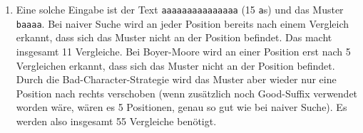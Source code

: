 \documentclass[11pt,a4paper]{article}
\begin{document}
\begin{loesung}
\begin{enumerate}
        \textbf{Horspool\textnormal{ (12 Vergleiche)}:}\\
        \begin{minipage}[t]{0.95\textwidth}
        \begin{Verbatim}[commandchars=\\\{\}]
DAS ENDE EINES LEBENS
LEBE\underline{N}
 LE\underline{B}\textbf{EN}
      LEBE\underline{N}
           LEBE\underline{N}
               \textbf{LEBEN}
                LEBE\underline{N}
        \end{Verbatim}
        \end{minipage} \\

        \textbf{Sunday\textnormal{ (13 Vergleiche)}:}\\
        \begin{minipage}[t]{0.95\textwidth}
        \begin{Verbatim}[commandchars=\\\{\}]
DAS ENDE EINES LEBENS
LEBE\underline{N}
 LE\underline{B}\textbf{EN}
       LEB\underline{E}\textbf{N}
         LEBE\underline{N}
               \textbf{LEBEN}
                LEBE\underline{N}
        \end{Verbatim}
        \end{minipage} \\

        \textbf{kombiniert\textnormal{ (13 Vergleiche)}:}\\
        \begin{minipage}[t]{0.95\textwidth}
        \begin{Verbatim}[commandchars=\\\{\}]
DAS ENDE EINES LEBENS
LEBE\underline{N}
 LE\underline{B}\textbf{EN}
       LEB\underline{E}\textbf{N}
            LEBE\underline{N}
               \textbf{LEBEN}
                LEBE\underline{N}
        \end{Verbatim}
        \end{minipage}

        \item
        Eine solche Eingabe ist der Text \texttt{aaaaaaaaaaaaaaa} (15 \texttt{a}s) und das Muster \texttt{baaaa}.
        Bei naiver Suche wird an jeder Position bereits nach einem Vergleich erkannt, dass sich das Muster nicht an der Position befindet.
        Das macht insgesamt 11 Vergleiche.
        Bei Boyer-Moore wird an einer Position erst nach 5 Vergleichen erkannt, dass sich das Muster nicht an der Position befindet.
        Durch die Bad-Character-Strategie wird das Muster aber wieder nur eine Position nach rechts verschoben (wenn zusätzlich noch Good-Suffix verwendet worden wäre, wären es 5 Positionen, genau so gut wie bei naiver Suche).
        Es werden also insgesamt 55 Vergleiche benötigt.


\end{enumerate}
\end{loesung}
\end{document}
